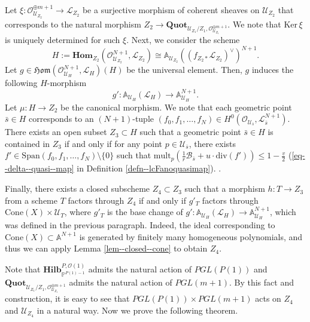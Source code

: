 \documentclass[12pt,twoside]{amsart}
\theoremstyle{definition}
\begin{document}
Let $\xi\colon \mathcal{O}_{\mathcal{U}_{Z_2}}^{\oplus m+1}\to\mathscr{L}_{Z_{2}}$ be a surjective morphism of coherent sheaves on $\mathcal{U}_{Z_{2}}$ that corresponds to the natural morphism $Z_2\to \mathbf{Quot}_{\mathcal{U}_{Z_1}/Z_1,\mathcal{O}_{\mathcal{U}_{Z_1}}^{\oplus m+1}}$. 
We note that $\mathrm{Ker}\,\xi$ is uniquely determined for such $\xi$.
Next, we consider the scheme 
$$H:=\mathbf{Hom}_{Z_2}(\mathcal{O}^{N+1}_{\mathcal{U}_{Z_2}},\mathscr{L}_{Z_{2}})\cong \mathbb{A}_{\mathcal{U}_{Z_2}}((f_{Z_2*}\mathscr{L}_{Z_2})^\vee)^{N+1}.$$
Let $g\in \mathfrak{Hom}(\mathcal{O}^{N+1}_{\mathcal{U}_H},\mathscr{L}_{H})(H)$ be the universal element. 
Then, $g$ induces the following $H$-morphism
\[
g'\colon\mathbb{A}_{\mathcal{U}_H}(\mathscr{L}_{H})\to \mathbb{A}_{\mathcal{U}_H}^{N+1}. 
\]
Let $\mu\colon H\to Z_2$ be the canonical morphism. 
We note that each geometric point $\bar{s}\in H$ corresponds to an $(N+1)$-tuple $(f_0,f_1,\ldots,f_N)\in H^0(\mathcal{O}_{\mathcal{U}_{\bar{s}}},\mathscr{L}_{\bar{s}}^{N+1})$.
There exists an open subset $Z_3\subset H$ such that a geometric point $\bar{s}\in H$ is contained in $Z_3$ if and only if for any point $p\in\mathcal{U}_{\overline{s}}$, there exists $f'\in \mathrm{Span}(f_0,f_1,\ldots,f_N)\setminus\{0\}$ such that $\mathrm{mult}_p(\frac{1}{r}\mathcal{B}_{\bar{s}}+u\cdot \mathrm{div}(f'))\le 1-\frac{v}{2}$ (\eqref{eq--delta--quasi--map} in Definition \ref{defn--lcFanoquasimap}). 
.



Finally, there exists a closed subscheme $Z_4\subset Z_3$ such that a morphism $h\colon T\to Z_3$ from a scheme $T$ factors through $Z_4$ if and only if $g'_{T}$ factors through $\mathrm{Cone}(X)\times \mathcal{U}_T$, where $g'_{T}$ is the base change of $g'\colon\mathbb{A}_{\mathcal{U}_H}(\mathscr{L}_{H})\to \mathbb{A}_{\mathcal{U}_H}^{N+1}$, which was defined in the previous paragraph. 
Indeed, the ideal corresponding to $\mathrm{Cone}(X)\subset \mathbb{A}^{N+1}$ is generated by finitely many homogeneous polynomials, and thus we can apply Lemma \ref{lem--closed--cone} to obtain $Z_4$. 

Note that $\mathbf{Hilb}^{P,\mathcal{O}(1)}_{\mathbb{P}^{P(1)-1}}$ admits the natural action of $PGL(P(1))$ and $\mathbf{Quot}_{\mathcal{U}_{Z_1}/Z_1,\mathcal{O}_{\mathcal{U}_{Z_1}}^{\oplus m+1}}$ admits the natural action of $PGL(m+1)$.
By this fact and construction, it is easy to see that $PGL(P(1))\times PGL(m+1)$ acts on $Z_4$ and $\mathcal{U}_{Z_4}$ in a natural way. 
Now we prove the following theorem. 
\end{document}
